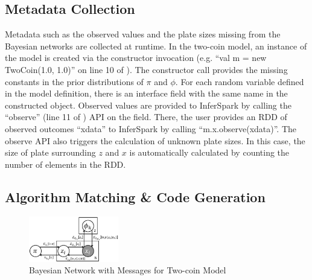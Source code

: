 
\subsection{Metadata Collection}

Metadata such as the observed values and the plate sizes missing from the
Bayesian networks are collected at runtime. In the two-coin
model, an instance of the model is created via the constructor invocation (e.g.
``{\sf val m = new TwoCoin(1.0, 1.0)}'' on line 10 of ). The constructor call provides
the missing constants in the prior distributions of $\pi$ and $\phi$. 
For each random variable defined in the model definition, 
there is an interface field with the
same name in the constructed object. Observed values are provided to InferSpark
by calling the ``{\sf observe}'' (line 11 of ) 
API on the field. 
There, the user provides an RDD of observed outcomes ``{\sf xdata}'' to InferSpark by calling
``{\sf m.x.observe(xdata)}''. The  {\sf observe} API also triggers 
the calculation of unknown plate sizes. 
In this case, the size of plate surrounding $z$ and $x$ is
automatically calculated by counting the number of elements in the RDD.


\subsection{Algorithm Matching \& Code Generation}

\begin{figure}
\centering
	\includegraphics[width=0.35\textwidth]{figs/two_coins_msg.eps}
	\caption{Bayesian Network with Messages for Two-coin Model}
	\label{fig:two_coins_msg}
\end{figure}

